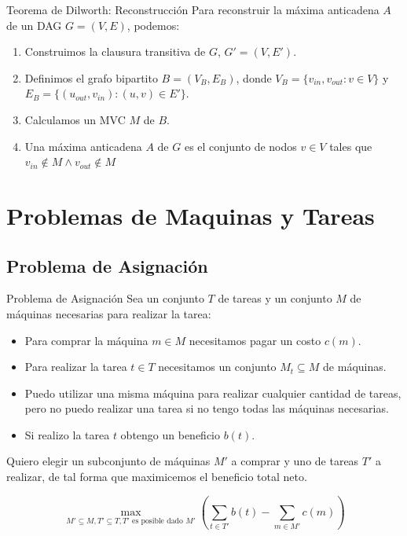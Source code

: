 \documentclass{beamer}
\begin{document}
    \begin{frame}{Teorema de Dilworth: Reconstrucción}
        Para reconstruir la máxima anticadena $A$ de un DAG $G = (V,E)$, podemos:
        \begin{enumerate}
            \item Construimos la clausura transitiva de $G$, $G' = (V,E')$.
            \pause
            \item Definimos el grafo bipartito $B = (V_B,E_B)$, donde $V_B = \{v_{in}, v_{out} : v \in V\}$ y $E_B = \{(u_{out}, v_{in}) : (u,v) \in E'\}$.
            \pause
            \item Calculamos un MVC $M$ de $B$.
            \pause
            \item Una máxima anticadena $A$ de $G$ es el conjunto de nodos $v \in V$ tales que $v_{in} \not \in M \wedge v_{out} \not \in M$
        \end{enumerate}
    \end{frame}

\section{Problemas de Maquinas y Tareas}

\subsection{Problema de Asignación}

\begin{frame}{Problema de Asignación}
    Sea un conjunto $T$ de tareas y un conjunto $M$ de máquinas necesarias para realizar la tarea:
    \pause
    \begin{itemize}
        \item Para comprar la máquina $m \in M$ necesitamos pagar un costo $c(m)$.
        \pause
        \item Para realizar la tarea $t \in T$ necesitamos un conjunto $M_t \subseteq M$ de máquinas.
        \pause
        \item Puedo utilizar una misma máquina para realizar cualquier cantidad de tareas, pero no puedo realizar una tarea si no tengo todas las máquinas necesarias.
        \pause 
        \item Si realizo la tarea $t$ obtengo un beneficio $b(t)$.
    \end{itemize}
    \pause 
    Quiero elegir un subconjunto de máquinas $M'$ a comprar y uno de tareas $T'$ a realizar, de tal forma que maximicemos el beneficio total neto.

    $$
    \max_{M' \subseteq M, T' \subseteq T, T'\text{ es posible dado }M'} \left( \sum_{t \in T'} b(t) - \sum_{m \in M'} c(m) \right)
    $$
\end{frame}
\end{document}
